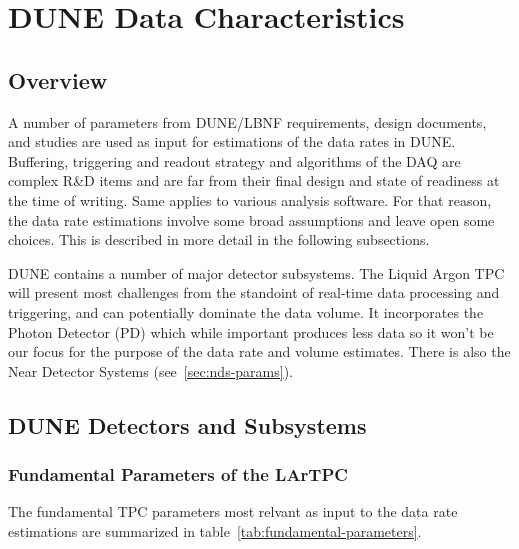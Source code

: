 \section{DUNE Data Characteristics}
\subsection{Overview}

A number of parameters from DUNE/LBNF requirements, design documents,  and studies are used  as input
for estimations of the data rates in DUNE.
Buffering, triggering and readout strategy and algorithms of the DAQ
are complex R\&D items and are far from their final design and state of
readiness at the time of writing. Same applies to various analysis software.
For that reason, the data rate estimations involve some broad assumptions
and leave open some choices. This is described in more detail in the following subsections.

DUNE contains a number of major detector subsystems. The Liquid Argon TPC will present most challenges from
the standoint of real-time data processing and triggering, and can potentially dominate the data volume.
It incorporates the Photon Detector (PD) which while important produces less data so it won't be our focus
for the purpose of the data rate and volume estimates. There is also the Near
Detector Systems (see~\ref{sec:nds-params}).

\subsection{DUNE Detectors and Subsystems}

\subsubsection{Fundamental Parameters of the LArTPC}
\label{sec:fundamental-parameters}

The fundamental TPC parameters most relvant as input to the data rate estimations are summarized in
table~\ref{tab:fundamental-parameters}.

